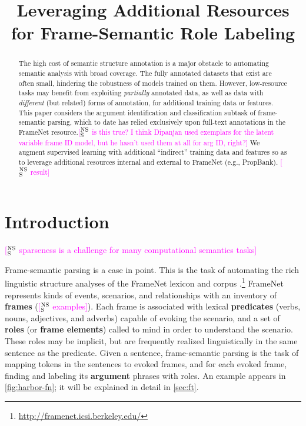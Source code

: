 \documentclass[11pt,a4paper]{article}
\title{Leveraging Additional Resources for Frame-Semantic Role Labeling}
\date{}
\newcommand{\ensuretext}[1]{#1}
\newcommand{\nssmarker}{\ensuretext{\textcolor{magenta}{\ensuremath{^{\textsc{NS}}_{\textsc{S}}}}}}
\newcommand{\arkcomment}[3]{\ensuretext{\textcolor{#3}{[#1 #2]}}}
\newcommand{\nss}[1]{\arkcomment{\nssmarker}{#1}{magenta}}
\begin{document}
\maketitle
\begin{abstract}
The high cost of semantic structure annotation is a major obstacle 
to automating semantic analysis with broad coverage.
The fully annotated datasets that exist are often small, 
hindering the robustness of models trained on them.
However, low-resource tasks may benefit from exploiting \emph{partially} annotated data, 
as well as data with \emph{different} (but related) forms of annotation,
for additional training data or features.
This paper considers the argument identification and classification subtask 
of frame-semantic parsing, which to date has relied exclusively 
upon full-text annotations in the FrameNet resource.\nss{is this true? I think Dipanjan used exemplars for the latent variable frame ID model, but he hasn't used them at all for arg ID, right?}
We augment supervised learning with additional 
``indirect'' training data and features 
so as to leverage additional resources internal and external to FrameNet (e.g., PropBank). 
\nss{result}
\end{abstract}

\section{Introduction}

\nss{sparseness is a challenge for many computational semantics tasks}

Frame-semantic parsing \citep{das-14} is a case in point.
This is the task of automating the rich linguistic structure analyses 
of the FrameNet lexicon and corpus \citep{baker-98}.\footnote{\url{http://framenet.icsi.berkeley.edu/}}
FrameNet represents kinds of events, scenarios, and relationships 
with an inventory of \textbf{frames} (\nss{examples}). 
Each frame is associated with lexical \textbf{predicates} (verbs, nouns, adjectives, and adverbs) capable of 
evoking the scenario, and a set of \textbf{roles} (or \textbf{frame elements}) 
called to mind in order to understand the scenario. 
These roles may be implicit, 
but are frequently realized linguistically in the same sentence as the predicate.
Given a sentence, frame-semantic parsing is the task of mapping tokens in the sentences
to evoked frames, and for each evoked frame, finding and labeling its \textbf{argument} phrases 
with roles. 
An example appears in \cref{fig:harbor-fn}; it will be explained in detail in \cref{sec:ft}.
\end{document}
